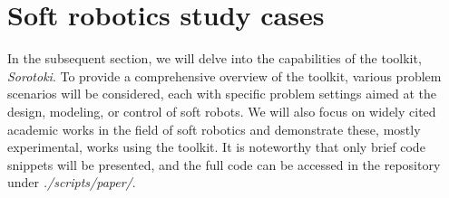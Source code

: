 
\section{Soft robotics study cases}
\label{sec:C5:studycases}
In the subsequent section, we will delve into the capabilities of the toolkit, \textit{Sorotoki}. To provide a comprehensive overview of the toolkit, various problem scenarios will be considered, each with specific problem settings aimed at the design, modeling, or control of soft robots. We will also focus on widely cited academic works in the field of soft robotics and demonstrate these, mostly experimental, works using the \sorotoki toolkit. It is noteworthy that only brief code snippets will be presented, and the full code can be accessed in the repository under \textit{./scripts/paper/}.
%
